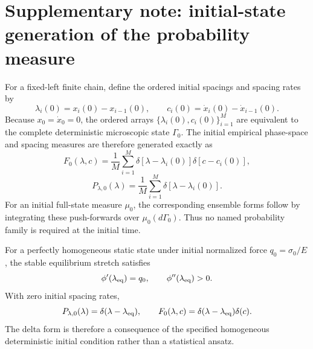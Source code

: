 
\section*{Supplementary note: initial-state generation of the probability measure}

For a fixed-left finite chain, define the ordered initial spacings and spacing rates by
\begin{equation}
\lambda_i(0)=x_i(0)-x_{i-1}(0),
\qquad
c_i(0)=\dot x_i(0)-\dot x_{i-1}(0).
\end{equation}
Because \(x_0=\dot x_0=0\), the ordered arrays \(\{\lambda_i(0),c_i(0)\}_{i=1}^M\) are equivalent to the complete deterministic microscopic state \(\Gamma_0\). The initial empirical phase-space and spacing measures are therefore generated exactly as
\begin{equation}
F_0(\lambda,c)
=\frac1M\sum_{i=1}^{M}
\delta[\lambda-\lambda_i(0)]\delta[c-c_i(0)],
\end{equation}
\begin{equation}
P_{\lambda,0}(\lambda)
=\frac1M\sum_{i=1}^{M}
\delta[\lambda-\lambda_i(0)].
\end{equation}
For an initial full-state measure \(\mu_0\), the corresponding ensemble forms follow by integrating these push-forwards over \(\mu_0(d\Gamma_0)\). Thus no named probability family is required at the initial time.

For a perfectly homogeneous static state under initial normalized force \(q_0=\sigma_0/E\), the stable equilibrium stretch satisfies
\begin{equation}
\phi'(\lambda_{\rm eq})=q_0,
\qquad
\phi''(\lambda_{\rm eq})>0.
\end{equation}
With zero initial spacing rates,
\begin{equation}
P_{\lambda,0}(\lambda)=\delta(\lambda-\lambda_{\rm eq}),
\qquad
F_0(\lambda,c)=\delta(\lambda-\lambda_{\rm eq})\delta(c).
\end{equation}
The delta form is therefore a consequence of the specified homogeneous deterministic initial condition rather than a statistical ansatz.

